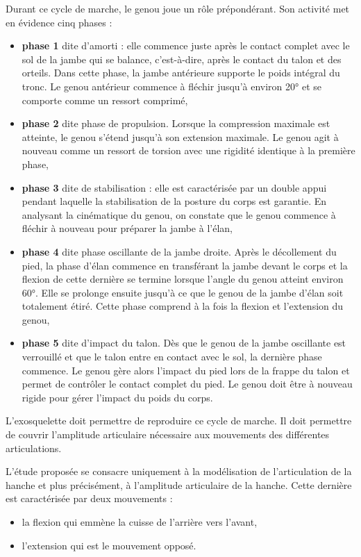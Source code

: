 Durant ce cycle de marche, le genou joue un rôle prépondérant. Son activité met en évidence cinq phases :
\begin{itemize}
 \item \textbf{phase 1} dite d'amorti : elle commence juste après le contact complet avec le sol de la jambe qui se balance, c'est-à-dire, après le contact du talon et des orteils. Dans cette phase, la jambe antérieure supporte le poids intégral du tronc. Le genou antérieur commence à fléchir jusqu'à environ 20° et se comporte comme un ressort comprimé,
 \item \textbf{phase 2} dite phase de propulsion. Lorsque la compression maximale est atteinte, le genou s'étend jusqu'à son extension maximale. Le genou agit à nouveau comme un ressort de torsion avec une rigidité identique à la première phase,
 \item \textbf{phase 3} dite de stabilisation : elle est caractérisée par un double appui pendant laquelle la stabilisation de la posture du corps est garantie. En analysant la cinématique du genou, on constate que le genou commence à fléchir à nouveau pour préparer la jambe à l'élan,
 \item \textbf{phase 4} dite phase oscillante de la jambe droite. Après le décollement du pied, la phase d'élan commence en transférant la jambe devant le corps et la flexion de cette dernière se termine lorsque l'angle du genou atteint environ 60°. Elle se prolonge ensuite jusqu'à ce que le genou de la jambe d'élan soit totalement étiré. Cette phase comprend à la fois la flexion et l'extension
du genou,
 \item \textbf{phase 5} dite d'impact du talon. Dès que le genou de la jambe oscillante est verrouillé et que le talon entre en contact avec le sol, la dernière phase commence. Le genou gère alors l'impact du pied lors de la frappe du talon et permet de contrôler le contact complet du pied. Le genou doit être à nouveau rigide pour gérer l'impact du poids du corps.
\end{itemize} 

L'exosquelette doit permettre de reproduire ce cycle de marche. Il doit permettre de couvrir l'amplitude articulaire nécessaire aux mouvements des différentes articulations.

L'étude proposée se consacre uniquement à la modélisation de l'articulation de la hanche et plus précisément, à l'amplitude articulaire de la hanche. Cette dernière est caractérisée par deux mouvements :
\begin{itemize}
 \item la flexion qui emmène la cuisse de l'arrière vers l'avant,
 \item l'extension qui est le mouvement opposé.
\end{itemize}

